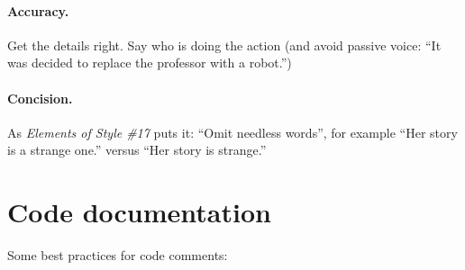 \documentclass[11pt]{article}
\begin{document}
\paragraph{Accuracy.} Get the details right. Say who is doing the action (and avoid passive voice: ``It was decided to replace the professor with a robot.'')

\paragraph{Concision.} As \emph{Elements of Style \#17} puts it: ``Omit needless words'', for example ``Her story is a strange one.'' versus ``Her story is strange.''

\section*{Code documentation}
Some best practices for code comments:
\end{document}
